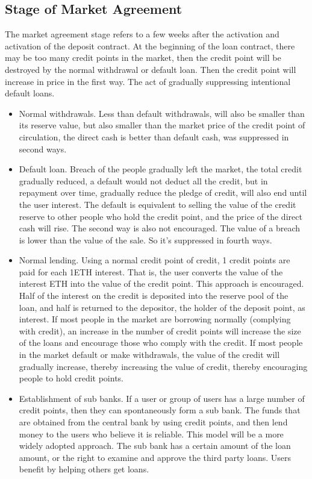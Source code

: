 \documentclass[a4paper, 10pt, conference]{ieeeconf} %
\begin{document}
\subsection{Stage of Market Agreement}
The market agreement stage refers to a few weeks after the activation and activation of the deposit contract. At the beginning of the loan contract, there may be too many credit points in the market, then the credit point will be destroyed by the normal withdrawal or default loan. Then the credit point will increase in price in the first way. The act of gradually suppressing intentional default loans.

\begin{itemize}
   \item Normal withdrawals. Less than default withdrawals, will also be smaller than its reserve value, but also smaller than the market price of the credit point of circulation, the direct cash is better than default cash, was suppressed in second ways.
   \item Default loan. Breach of the people gradually left the market, the total credit gradually reduced, a default would not deduct all the credit, but in repayment over time, gradually reduce the pledge of credit, will also end until the user interest. The default is equivalent to selling the value of the credit reserve to other people who hold the credit point, and the price of the direct cash will rise. The second way is also not encouraged. The value of a breach is lower than the value of the sale. So it's suppressed in fourth ways.
   \item Normal lending. Using a normal credit point of credit, 1 credit points are paid for each 1ETH interest. That is, the user converts the value of the interest ETH into the value of the credit point. This approach is encouraged. Half of the interest on the credit is deposited into the reserve pool of the loan, and half is returned to the depositor, the holder of the deposit point, as interest. If most people in the market are borrowing normally (complying with credit), an increase in the number of credit points will increase the size of the loans and encourage those who comply with the credit. If most people in the market default or make withdrawals, the value of the credit will gradually increase, thereby increasing the value of credit, thereby encouraging people to hold credit points.
   \item Establishment of sub banks. If a user or group of users has a large number of credit points, then they can spontaneously form a sub bank. The funds that are obtained from the central bank by using credit points, and then lend money to the users who believe it is reliable. This model will be a more widely adopted approach. The sub bank has a certain amount of the loan amount, or the right to examine and approve the third party loans. Users benefit by helping others get loans.

\end{itemize}
\end{document}
